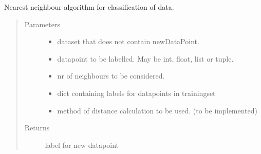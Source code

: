 \documentclass[letterpaper,10pt,english]{sphinxmanual}
\begin{document}
\begin{fulllineitems}
\label{\detokenize{classification:classification.nearestNeighbour}}
\sphinxAtStartPar
Nearest neighbour algorithm for classification of data.
\begin{quote}\begin{description}
\item[{Parameters}] \leavevmode\begin{itemize}
\item {} 
\sphinxAtStartPar
{} \textendash{} dataset that does not contain newDataPoint.

\item {} 
\sphinxAtStartPar
{} \textendash{} datapoint to be labelled. May be int, float, list or tuple.

\item {} 
\sphinxAtStartPar
{} \textendash{} nr of neighbours to be considered.

\item {} 
\sphinxAtStartPar
{} \textendash{} dict containing labels for datapoints in trainingset

\item {} 
\sphinxAtStartPar
{} \textendash{} method of distance calculation to be used. (to be implemented)

\end{itemize}

\item[{Returns}] \leavevmode
\sphinxAtStartPar
label for new datapoint

\end{description}\end{quote}

\end{fulllineitems}
\end{document}
